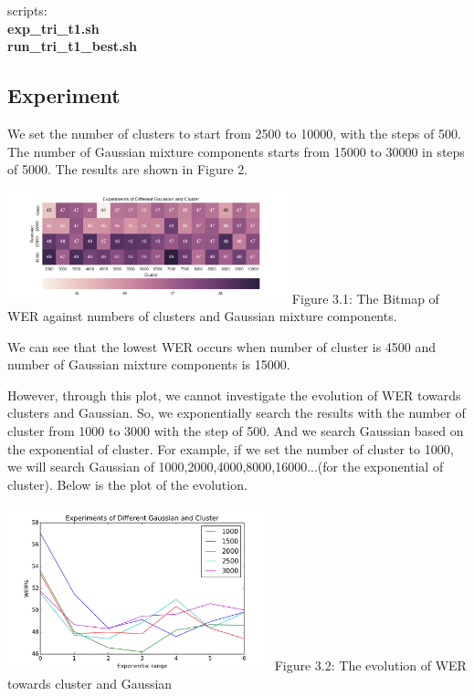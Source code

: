 \documentclass[]{article}
\begin{document}
\begin{multicols*}{2}
scripts: \textbf{\\ \indent exp\_tri\_t1.sh  \\ \indent run\_tri\_t1\_best.sh}

\subsection{Experiment}
We set the number of clusters to start from 2500 to 10000, with the steps of 500. The number of Gaussian mixture components starts from 15000 to 30000 in steps of 5000. The results are shown in Figure 2.

\begin{center}
\includegraphics[width=3.2in]{result1_wer_heatmap.png} 
Figure 3.1: The Bitmap of WER against numbers of clusters and Gaussian mixture components. 
\end{center}

We can see that the lowest WER occurs when number of cluster is 4500 and number of Gaussian mixture components is 15000.

However, through this plot, we cannot investigate the evolution of WER towards clusters and Gaussian. So, we exponentially search the results with the number of cluster from 1000 to 3000 with the step of 500. And we search Gaussian based on the exponential of cluster. For example, if we set the number of cluster to 1000, we will search Gaussian of 1000,2000,4000,8000,16000...(for the exponential of cluster). Below is the plot of the evolution.

\begin{center}
\includegraphics[width=3in]{result1_tri_small.png} 
Figure 3.2: The evolution of WER towards cluster and Gaussian 
\end{center}


\end{multicols*}
\end{document}
